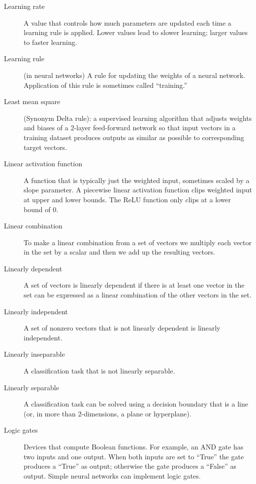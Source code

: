 \begin{description}
\item[Learning rate] A value that controls how much parameters are updated each time a learning rule is applied. Lower values lead to slower learning; larger values to faster learning.

\item[Learning rule] (in neural networks) A rule for updating the weights of a neural network. Application of this rule is sometimes called ``training.''

\item[Least mean square] (Synonym Delta rule): a supervised learning algorithm that adjusts weights and biases of a 2-layer feed-forward network so that input vectors in a training dataset produces outputs as similar as possible to corresponding target vectors.

\item[Linear activation function] A function that is typically just the weighted input, sometimes scaled by a slope parameter. A piecewise linear activation function clips weighted input at  upper and lower bounds. The ReLU function only clips at a lower bound of 0.

\item[Linear combination] To make a linear combination from a set of vectors we multiply each vector in the set by a scalar and then we add up the resulting vectors.

\item[Linearly dependent] A set of vectors is linearly dependent if there is at least one vector in the set can be expressed as a linear combination of the other vectors in the set.

\item[Linearly independent] A set of nonzero vectors that is not linearly
dependent is linearly independent.

\item[Linearly inseparable] A classification task that is not linearly separable.

\item[Linearly separable] A classification task can be solved using a decision boundary that is a line (or, in more than 2-dimensions, a plane or hyperplane).

\item[Logic gates] Devices that compute Boolean functions. For example, an AND gate has two inputs and one output. When both inputs are set to ``True'' the gate produces a ``True'' as output; otherwise the gate produces a ``False'' as output. Simple neural networks can implement logic gates.


\end{description}
